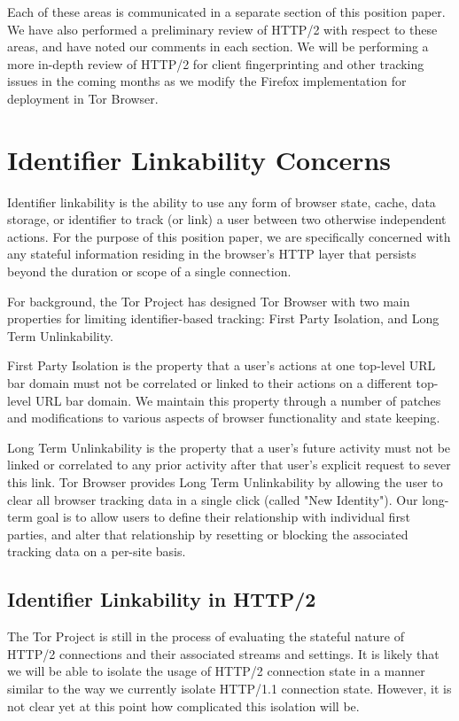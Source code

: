 \documentclass[letterpaper,11pt]{llncs}
\begin{document}
Each of these areas is communicated in a separate section of this position
paper. We have also performed a preliminary review of HTTP/2 with respect to
these areas, and have noted our comments in each section. We will be
performing a more in-depth review of HTTP/2 for client fingerprinting and
other tracking issues in the coming months as we modify the Firefox
implementation for deployment in Tor Browser.

\section{Identifier Linkability Concerns}

Identifier linkability is the ability to use any form of browser state, cache,
data storage, or identifier to track (or link) a user between two otherwise
independent actions. For the purpose of this position paper, we are
specifically concerned with any stateful information residing in the browser's
HTTP layer that persists beyond the duration or scope of a single connection.

For background, the Tor Project has designed Tor Browser with two main
properties for limiting identifier-based tracking: First Party Isolation, and
Long Term Unlinkability.

First Party Isolation is the property that a user's actions at one
top-level URL bar domain must not be correlated or linked to their actions on a
different top-level URL bar domain. We maintain this property through a number
of patches and modifications to various aspects of browser functionality and
state keeping\cite{torbrowser-identifiers}.

Long Term Unlinkability is the property that a user's future activity must not
be linked or correlated to any prior activity after that user's explicit
request to sever this link. Tor Browser provides Long Term Unlinkability by
allowing the user to clear all browser tracking data in a single click (called
"New Identity")\cite{torbrowser-longterm}. Our long-term goal is to allow
users to define their relationship with individual first parties, and alter
that relationship by resetting or blocking the associated tracking data on a
per-site basis.

\subsection{Identifier Linkability in HTTP/2}

The Tor Project is still in the process of evaluating the stateful nature of
HTTP/2 connections and their associated streams and settings. It is likely
that we will be able to isolate the usage of HTTP/2 connection state in a
manner similar to the way we currently isolate HTTP/1.1 connection state.
However, it is not clear yet at this point how complicated this isolation will
be.
\end{document}
